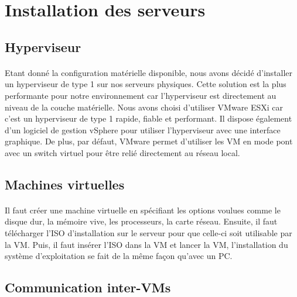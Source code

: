 \section{Installation des serveurs}
	\subsection{Hyperviseur}
		\paragraph{}
			Etant donné la configuration matérielle disponible, nous avons décidé d’installer un hyperviseur de type 1 sur nos serveurs physiques. Cette solution est la plus performante pour notre environnement car l’hyperviseur est directement au niveau de la couche matérielle. Nous avons choisi d’utiliser VMware ESXi car c’est un hyperviseur de type 1 rapide, fiable et performant. Il dispose également d’un logiciel de gestion vSphere pour utiliser l’hyperviseur avec une interface graphique. De plus, par défaut, VMware permet d’utiliser les VM en mode pont avec un switch virtuel pour être relié directement au réseau local.

	\subsection{Machines virtuelles}
		\paragraph{}
			Il faut créer une machine virtuelle en spécifiant les options voulues comme le disque dur, la mémoire vive, les processeurs, la carte réseau. Ensuite, il faut télécharger l’ISO d’installation sur le serveur pour que celle-ci soit utilisable par la VM. Puis, il faut insérer l’ISO dans la VM et lancer la VM, l’installation du système d’exploitation se fait de la même façon qu’avec un PC. 

	\subsection{Communication inter-VMs}
